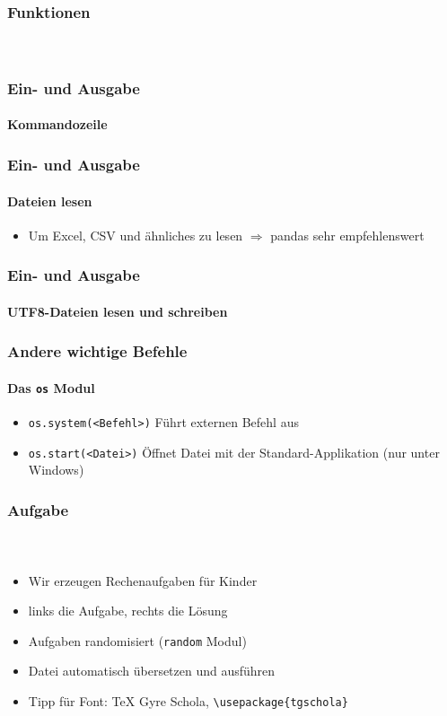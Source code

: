 \documentclass[12pt,ngerman]{beamer}
\newcounter{Aufgabe}
\begin{document}
\begin{frame}[fragile]
\frametitle{Funktionen}
\framesubtitle{~}



\end{frame}


\begin{frame}[fragile]
\frametitle{Ein- und Ausgabe}
\framesubtitle{Kommandozeile}



\end{frame}

\begin{frame}[fragile]
\frametitle{Ein- und Ausgabe}
\framesubtitle{Dateien lesen}

 

\begin{itemize}
	\item Um Excel, CSV und ähnliches zu lesen $\Rightarrow$ pandas sehr empfehlenswert
\end{itemize}
\end{frame}


\begin{frame}[fragile]
\frametitle{Ein- und Ausgabe}
\framesubtitle{UTF8-Dateien lesen und schreiben}

 

\end{frame}

\begin{frame}[fragile]
\frametitle{Andere wichtige Befehle}
\framesubtitle{Das \texttt{os} Modul}

\begin{itemize}
\item \lstinline{os.system(<Befehl>)} Führt externen Befehl aus
\item \lstinline{os.start(<Datei>)} Öffnet Datei mit der Standard-Applikation (nur unter Windows)
\end{itemize}
\end{frame}

\begin{frame}[fragile]
\frametitle{Aufgabe \theAufgabe}
\framesubtitle{~}

\begin{itemize}
\item Wir erzeugen Rechenaufgaben für Kinder
\item links die Aufgabe, rechts die Lösung
\item Aufgaben randomisiert (\texttt{random} Modul)
\item Datei automatisch übersetzen und ausführen
\item Tipp für Font: TeX Gyre Schola, \verb|\usepackage{tgschola}|
\end{itemize}
\end{frame}
\end{document}

